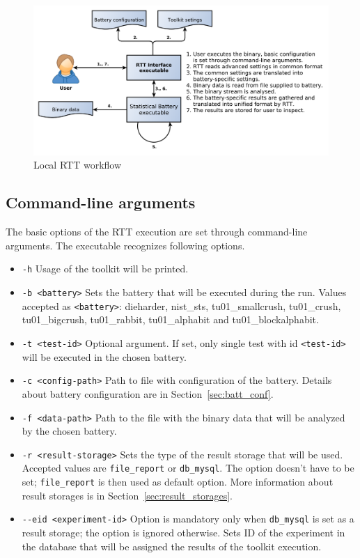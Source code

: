 \documentclass[
	digital,    %
	oneside,    %
	color,
	11pt,
	nocover,
	notable,
	nolof,
	nolot,
]{fithesis3}
\theoremstyle{definition}
\theoremstyle{remark}
\begin{document}
\begin{figure}[h!]
\begin{nomar}
\centering
\includegraphics[width=\paperwidth-4cm]{figures/local-rtt-workflow.pdf}
\end{nomar}
\caption{Local RTT workflow}
\label{fig:rtt_local_workflow}
\end{figure}

\pagebreak
\subsection{Command-line arguments}
The basic options of the RTT execution are set through command-line arguments. The executable recognizes following options.

\begin{itemize}
\item \texttt{-h} Usage of the toolkit will be printed.
\item \texttt{-b <battery>} Sets the battery that will be executed during the run. Values accepted as \texttt{<battery>}: dieharder, nist\_sts, tu01\_smallcrush, tu01\_crush, tu01\_bigcrush, \linebreak tu01\_rabbit, tu01\_alphabit and tu01\_blockalphabit.
\item \texttt{-t <test-id>} Optional argument. If set, only single test with id \texttt{<test-id>} will be executed in the chosen battery.
\item \texttt{-c <config-path>} Path to file with configuration of the battery. Details about battery configuration are in Section~\ref{sec:batt_conf}.
\item \texttt{-f <data-path>} Path to the file with the binary data that will be analyzed by the chosen battery.
\item \texttt{-r <result-storage>} Sets the type of the result storage that will be used. Accepted values are \texttt{file\_report} or \texttt{db\_mysql}. The option doesn't have to be set; \texttt{file\_report} is then used as default option. More information about result storages is in Section~\ref{sec:result_storages}.
\item \texttt{-{}-eid <experiment-id>} Option is mandatory only when \texttt{db\_mysql} is set as a result storage; the option is ignored otherwise. Sets ID of the experiment in the database that will be assigned the results of the toolkit execution.
\end{itemize}
\end{document}

